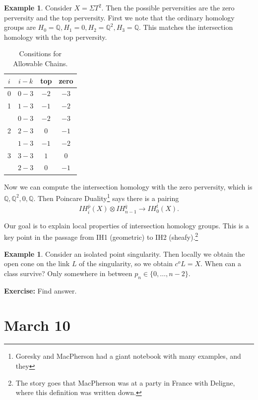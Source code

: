 \documentclass[leqno, openany]{memoir}
\theoremstyle{definition}
\newtheorem{exm}[thm]{Example}
\theoremstyle{remark}
\theoremstyle{plain}
\theoremstyle{definition}
\theoremstyle{remark}
\newcommand{\Q}{\mathbb{Q}}
\begin{document}
\begin{exm} Consider $X = \Sigma T^2$. Then the possible perversities are the
    zero perversity and the top perversity. First we note that the ordinary
    homology groups are $H_0 = \Q, H_1 = 0, H_2 = \Q^2, H_3 = \Q$. This matches
    the intersection homology with the top perversity.

    \begin{table}[H] \begin{center} \begin{tabular}{cccc} \toprule $i$ & $i-k$
    & top  & zero \\ \midrule $0$ & $0-3$ & $-2$ & $-3$ \\ 1   & $1-3$ & $-1$ &
        $-2$ \\ & $0-3$ & $-2$ & $-3$ \\ 2   & $2-3$ & $0$  & $-1$ \\ & $1-3$ &
        $-1$ & $-2$ \\ 3   & $3-3$ & $1$  & $0$  \\ & $2-3$ & $0$  & $-1$ \\
    \bottomrule \end{tabular} \end{center} \caption{Consitions for Allowable
Chains.} \end{table} Now we can compute the intersection homology with the zero
perversity, which is $\Q, \Q^2, 0, \Q$. Then Poincare Duality\footnote{Goresky
and MacPherson had a giant notebook with many examples, and they} says there is
a pairing \[ IH_i^{\overline{p}}(X) \otimes IH_{n-1}^{\overline{q}} \to
IH_0^{\overline{t}}(X). \] \end{exm}

Our goal is to explain local properties of intersection homology groups. This
is a key point in the passage from IH1 (geometric) to IH2
(sheafy).\footnote{The story goes that MacPherson was at a party in France with
Deligne, where this definition was written down.}

\begin{exm} Consider an isolated point singularity. Then locally we obtain the
    open cone on the link $L$ of the singularity, so we obtain $c^oL = X$. When
    can a class survive? Only somewhere in between $p_n \in \{0, \ldots, n-2
    \}$.

    \textbf{Exercise:} Find answer.  \end{exm}

\chapter{March 10}%
\end{document}
